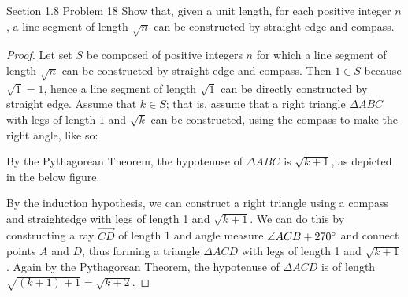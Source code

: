 \documentclass{article}
\begin{document}
    \thispagestyle{page7}


    \begin{tbhtheorem}{Section 1.8 Problem 18}
        Show that, given a unit length, for each positive integer $n$, a line segment of length $\sqrt{n}$ can be constructed by straight edge and compass.
    \end{tbhtheorem}

    \begin{proof}

        Let set $S$ be composed of positive integers $n$ for which a line segment of length $\sqrt{n}$ can be constructed by straight edge and compass. Then $1\in S$ because $\sqrt{1}=1$, hence a line segment of length
        $\sqrt{1}$ can be directly constructed by straight edge. Assume that $k\in S$; that is,
        assume that a right triangle $\Delta ABC$ with legs of length $1$ and $\sqrt{k}$ can be constructed, using the compass to make the right angle, like so:

        \begin{center}
        \end{center}

        \noindent By the Pythagorean Theorem, the hypotenuse of $\Delta ABC$ is $\sqrt{k+1}$, as depicted in the below figure.

        \begin{center}
        \end{center}

        \noindent By the induction hypothesis, we can construct a right triangle using a compass and straightedge with legs of length 1 and $\sqrt{k+1}$. We can do this by constructing a ray $\overrightarrow{CD}$ of
        length 1 and angle measure $\angle ACB + 270\degree$ and connect points $A$ and $D$, thus forming a triangle $\Delta ACD$ with legs of length 1 and $\sqrt{k+1}$. Again by the Pythagorean Theorem, the hypotenuse of
        $\Delta ACD$ is of length $\sqrt{(k+1)+1}=\sqrt{k+2}$.


\end{proof}
\end{document}
